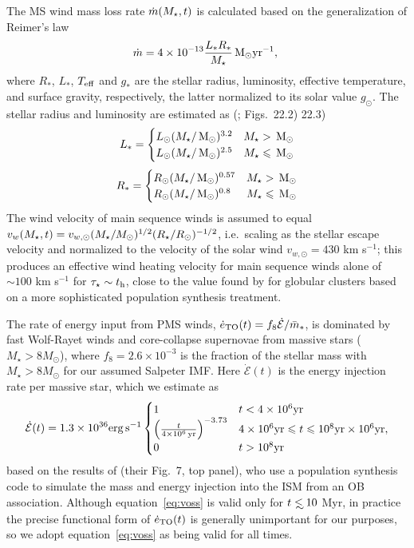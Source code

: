 The MS wind mass loss rate $\dot{m}(M_{\star}, t)$ is calculated based on
the generalization of Reimer's law
\begin{align}
  \dot{m}=4 \times 10^{-13} \frac{L_* R_*}{M_{\star}} \,{\rm M_\odot} {\rm yr}^{-1},\
\end{align}
where  $R_*$, $L_*$, $T_{\rm eff}$ and $g_*$ are the stellar radius,
luminosity, effective temperature, and surface gravity, respectively, the latter normalized to its solar value $g_{\odot}$.  The stellar radius and luminosity are estimated as (\citet{Kippenhahn&Weigert90}; Figs.~22.2) 22.3)
\begin{align}
L_*=
\begin{cases}
L_{\odot} (M_{\star}/\,{\rm M_\odot})^{3.2} & M_{\star} > \,{\rm M_\odot} \\
L_{\odot} (M_{\star}/\,{\rm M_\odot})^{2.5} & M_{\star} \leqslant \,{\rm M_\odot}
\end{cases}
\end{align}
\begin{align}
R_*=
\begin{cases}
R_{\odot} (M_{\star}/\,{\rm M_\odot})^{0.57} & M_{\star} > \,{\rm M_\odot} \\
R_{\odot} (M_{\star}/\,{\rm M_\odot})^{0.8} & M_{\star} \leqslant \,{\rm M_\odot}
\end{cases}
\end{align}
The wind velocity of main sequence winds is assumed to equal $v_w
(M_{\star}, t) =
v_{w,\odot}(M_{\star}/M_{\odot})^{1/2}(R_{\star}/R_{\odot})^{-1/2}$,
i.e.~scaling as the stellar escape velocity and normalized to the
velocity of the solar wind $v_{w,\odot} = 430$ km s$^{-1}$; this
produces an effective wind heating velocity for main sequence winds
alone of $\sim 100$ km s$^{-1}$ for $\tau_{\star} \sim t_{\rm h}$,
close to the value found by \citet{NaimanSoares-Furtado+:2013a} for
globular clusters based on a more sophisticated population synthesis
treatment.

The rate of energy input from PMS winds, $\dot{e}_{\rm TO}(t) =
f_{8}\dot{\mathcal{E}}/\bar{m}_*$, is dominated by fast Wolf-Rayet
winds and core-collapse supernovae from massive stars ($M_{\star} >
8M_{\odot}$), where $f_{8} =2.6 \times 10^{-3}$ is the fraction of the
stellar mass with $M_{\star} > 8M_{\odot}$ for our assumed Salpeter
IMF.  Here $\dot{\mathcal{E}} (t)$ is the energy injection rate per
massive star, which we estimate as
\begin{align}
\dot{\mathcal{E}} (t)=  1.3 \times 10^{36} {\rm erg\,s^{-1}}
\begin{cases}
  1 & t<4 \times 10^6 {\rm yr}\\
  \left(\frac{t}{4 \times  10^6\,{\rm yr}}\right)^{-3.73} &  4\times
  10^{6} {\rm yr}  \le t \le 10^{8} {\rm yr}
  \times 10^6 {\rm yr},\\
  0 & t > 10^8 {\rm yr}
\end{cases}
\label{eq:voss}
\end{align}
based on the results of \citet{VossDiehl+:2009a} (their Fig.~7, top
panel), who use a population synthesis code to simulate the mass and
energy injection into the ISM from an OB association.  Although
equation~\eqref{eq:voss} is valid only for $t \lsim 10$ Myr, in
practice the precise functional form of $\dot{e}_{\rm TO}(t)$ is
generally unimportant for our purposes, so we adopt
equation~\eqref{eq:voss} as being valid for all times. 


